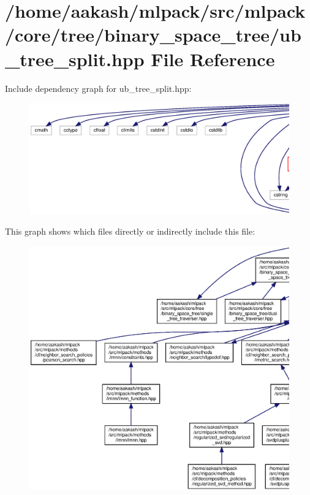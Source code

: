 \section{/home/aakash/mlpack/src/mlpack/core/tree/binary\+\_\+space\+\_\+tree/ub\+\_\+tree\+\_\+split.hpp File Reference}
\label{ub__tree__split_8hpp}
Include dependency graph for ub\+\_\+tree\+\_\+split.\+hpp\+:
\nopagebreak
\begin{figure}[H]
\begin{center}
\leavevmode
\includegraphics[width=350pt]{ub__tree__split_8hpp__incl}
\end{center}
\end{figure}
This graph shows which files directly or indirectly include this file\+:
\nopagebreak
\begin{figure}[H]
\begin{center}
\leavevmode
\includegraphics[width=350pt]{ub__tree__split_8hpp__dep__incl}
\end{center}
\end{figure}
